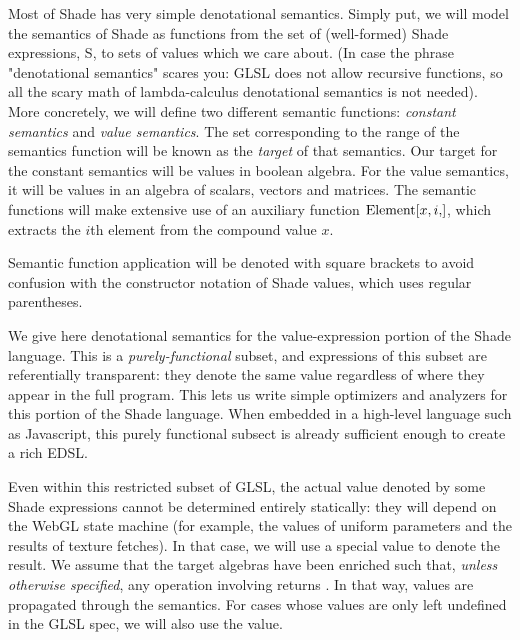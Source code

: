 \documentclass{article}
\begin{document}
Most of Shade has very simple denotational semantics. Simply put, we
will model the semantics of Shade as functions from the set of
(well-formed) Shade expressions, S, to sets of values which we care
about. (In case the phrase "denotational semantics" scares you: GLSL
does not allow recursive functions, so all the scary math of
lambda-calculus denotational semantics is not needed).  More
concretely, we will define two different semantic functions:
\emph{constant semantics} and \emph{value semantics}. 
The set corresponding to the range of
the semantics function will be known as the \emph{target} of that
semantics. Our target for the constant semantics will be values in
boolean algebra. For the value semantics, it will be
values in an algebra of scalars, vectors and matrices.
The semantic functions will make extensive use of an auxiliary function 
$\elt{x, i}$, which extracts the $i$th element from the compound value $x$.

Semantic function application will be denoted with square brackets to
avoid confusion with the constructor notation of Shade values, which
uses regular parentheses.

We give here denotational semantics for the value-expression
portion of the Shade language. This is a \emph{purely-functional} subset,
and expressions of this subset are referentially transparent: they
denote the same value regardless of where they appear in the full
program. This lets us write simple optimizers and analyzers for
this portion of the Shade language. When embedded in a high-level
language such as Javascript, this purely functional subsect is already
sufficient enough to create a rich EDSL.

Even within this restricted subset of GLSL, the actual value denoted
by some Shade expressions cannot be determined entirely statically:
they will depend on the WebGL state machine (for example, the values
of uniform parameters and the results of texture fetches). In that
case, we will use a special value  to denote the result. We
assume that the target algebras have been enriched such that, \emph{unless
otherwise specified}, any operation involving  returns
. In that way,  values are propagated through the
semantics. For cases whose values are only left undefined in the GLSL
spec, we will also use the  value.
\end{document}
